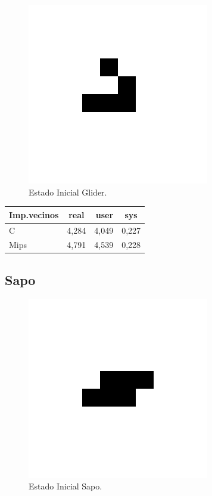 \documentclass[a4paper,12pt]{article}
\numberwithin{equation}{section}
\numberwithin{figure}{section}
\begin{document}
	\begin{figure}[!htb]
		\centering
		\includegraphics[scale=0.5]{includes/gl_img/glider001.png}
		\caption{Estado Inicial Glider.}
	\end{figure}
	
	\begin{center}
		\begin{tabular}{|l|c|r|c|}
			\hline 
			Imp.vecinos & real & user & sys\\
			\hline 
			C & 4,284 & 4,049 & 0,227\\
			\hline
			Mips & 4,791 & 4,539 & 0,228\\
			\hline
		\end{tabular}
	\end{center}
	
	\subsection{Sapo}
	
	\begin{figure}[!htb]
		\centering
		\includegraphics[scale=0.5]{includes/gl_img/sapo001.png}
		\caption{Estado Inicial Sapo.}
	\end{figure}
	
\end{document}
